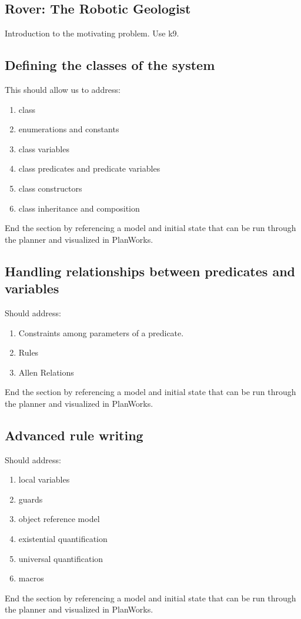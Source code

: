 \documentclass[10pt, letterpaper, twoside]{article}
\begin{document}
\subsection{Rover: The Robotic Geologist}
Introduction to the motivating problem. Use k9.

\subsection{Defining the classes of the system}
This should allow us to address:
\begin{enumerate}
\item class
\item enumerations and constants
\item class variables
\item class predicates and predicate variables
\item class constructors
\item class inheritance and composition
\end{enumerate}
End the section by referencing a model and initial state that can be run through the planner and visualized in PlanWorks.

\subsection{Handling relationships between predicates and variables}
Should address:
\begin{enumerate}
\item Constraints among parameters of a predicate.
\item Rules
\item Allen Relations
\end{enumerate}
End the section by referencing a model and initial state that can be run through the planner and visualized in PlanWorks.

\subsection{Advanced rule writing}
Should address:
\begin{enumerate}
\item local variables
\item guards
\item object reference model
\item existential quantification
\item universal quantification
\item macros
\end{enumerate}
End the section by referencing a model and initial state that can be run through the planner and visualized in PlanWorks.
\end{document}
